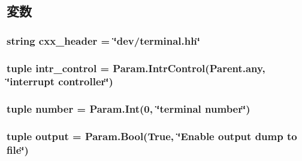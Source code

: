 \subsection{変数}
\hypertarget{classTerminal_1_1Terminal_a17da7064bc5c518791f0c891eff05fda}{
\subsubsection[{cxx\_\-header}]{\setlength{\rightskip}{0pt plus 5cm}string {\bf cxx\_\-header} = \char`\"{}dev/terminal.hh\char`\"{}}}
\label{classTerminal_1_1Terminal_a17da7064bc5c518791f0c891eff05fda}
\hypertarget{classTerminal_1_1Terminal_aeaf8661c040c8b846389e91469b79801}{
\subsubsection[{intr\_\-control}]{\setlength{\rightskip}{0pt plus 5cm}tuple {\bf intr\_\-control} = Param.IntrControl(Parent.any, \char`\"{}interrupt controller\char`\"{})}}
\label{classTerminal_1_1Terminal_aeaf8661c040c8b846389e91469b79801}
\hypertarget{classTerminal_1_1Terminal_a629b7ca94b6a486bdc504ed959b90cc8}{
\subsubsection[{number}]{\setlength{\rightskip}{0pt plus 5cm}tuple {\bf number} = Param.Int(0, \char`\"{}terminal {\bf number}\char`\"{})}}
\label{classTerminal_1_1Terminal_a629b7ca94b6a486bdc504ed959b90cc8}
\hypertarget{classTerminal_1_1Terminal_acf316e258896197f4e917a6547e49532}{
\subsubsection[{output}]{\setlength{\rightskip}{0pt plus 5cm}tuple {\bf output} = Param.Bool(True, \char`\"{}Enable {\bf output} dump to file\char`\"{})}}
